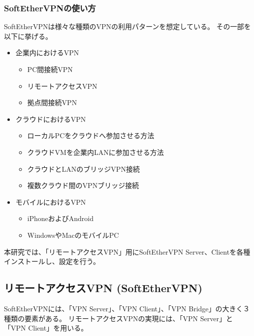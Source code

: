 \documentclass[11pt,a4j,titlepage]{jreport}
\begin{document}
\subsubsection{SoftEtherVPNの使い方}
SoftEtherVPNは様々な種類のVPNの利用パターンを想定している。
その一部を以下に挙げる。

\begin{itemize}
    \item 企業内におけるVPN
    \begin{itemize}
        \item PC間接続VPN
        \item リモートアクセスVPN
        \item 拠点間接続VPN
    \end{itemize}
    \item クラウドにおけるVPN
    \begin{itemize}
        \item ローカルPCをクラウドへ参加させる方法
        \item クラウドVMを企業内LANに参加させる方法
        \item クラウドとLANのブリッジVPN接続
        \item 複数クラウド間のVPNブリッジ接続
    \end{itemize}
    \item モバイルにおけるVPN
    \begin{itemize}
        \item iPhoneおよびAndroid
        \item WindowsやMacのモバイルPC
    \end{itemize}
\end{itemize}


本研究では、「リモートアクセスVPN」用にSoftEtherVPN Server、Clientを各種インストールし、設定を行う。

\subsection{リモートアクセスVPN (SoftEtherVPN)}
SoftEtherVPNには、「VPN Server」、「VPN Client」、「VPN Bridge」の大きく３種類の要素がある。
リモートアクセスVPNの実現には、「VPN Server」と「VPN Client」を用いる。
\end{document}
